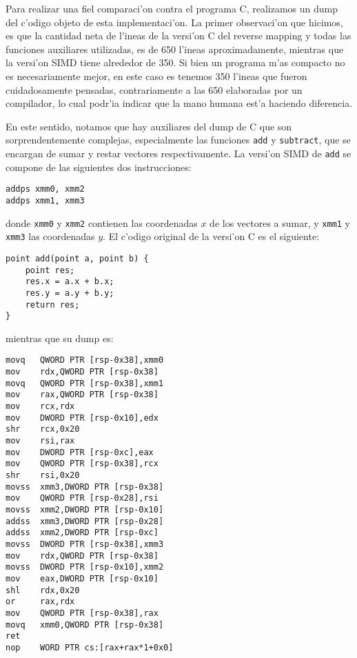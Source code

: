 Para realizar una fiel comparaci'on contra el programa C, realizamos un dump del c'odigo objeto de esta implementaci'on. La primer observaci'on que hicimos, es que la cantidad neta de l'ineas de la versi'on C del reverse mapping y todas las funciones auxiliares utilizadas, es de 650 l'ineas aproximadamente, mientras que la versi'on SIMD tiene alrededor de 350. Si bien un programa m'as compacto no es necesariamente mejor, en este caso es tenemos 350 l'ineas que fueron cuidadosamente pensadas, contrariamente a las 650 elaboradas por un compilador, lo cual podr'ia indicar que la mano humana est'a haciendo diferencia.

En este sentido, notamos que hay auxiliares del dump de C que son sorprendentemente complejas, especialmente las funciones \texttt{add} y \texttt{subtract}, que se encargan de sumar y restar vectores respectivamente. La versi'on SIMD de \texttt{add} se compone de las siguientes dos instrucciones:

\begin{verbatim}
addps xmm0, xmm2
addps xmm1, xmm3
\end{verbatim}

\noindent
donde \texttt{xmm0} y \texttt{xmm2} contienen las coordenadas $x$ de los vectores a sumar, y \texttt{xmm1} y \texttt{xmm3} las coordenadas $y$. El c'odigo original de la versi'on C es el siguiente:

\begin{verbatim}
point add(point a, point b) {
    point res;
    res.x = a.x + b.x;
    res.y = a.y + b.y;
    return res;
}
\end{verbatim}

\noindent
mientras que su dump es:

\begin{verbatim}
movq   QWORD PTR [rsp-0x38],xmm0
mov    rdx,QWORD PTR [rsp-0x38]
movq   QWORD PTR [rsp-0x38],xmm1
mov    rax,QWORD PTR [rsp-0x38]
mov    rcx,rdx
mov    DWORD PTR [rsp-0x10],edx
shr    rcx,0x20
mov    rsi,rax
mov    DWORD PTR [rsp-0xc],eax
mov    QWORD PTR [rsp-0x38],rcx
shr    rsi,0x20
movss  xmm3,DWORD PTR [rsp-0x38]
mov    QWORD PTR [rsp-0x28],rsi
movss  xmm2,DWORD PTR [rsp-0x10]
addss  xmm3,DWORD PTR [rsp-0x28]
addss  xmm2,DWORD PTR [rsp-0xc]
movss  DWORD PTR [rsp-0x38],xmm3
mov    rdx,QWORD PTR [rsp-0x38]
movss  DWORD PTR [rsp-0x10],xmm2
mov    eax,DWORD PTR [rsp-0x10]
shl    rdx,0x20
or     rax,rdx
mov    QWORD PTR [rsp-0x38],rax
movq   xmm0,QWORD PTR [rsp-0x38]
ret    
nop    WORD PTR cs:[rax+rax*1+0x0]
\end{verbatim}